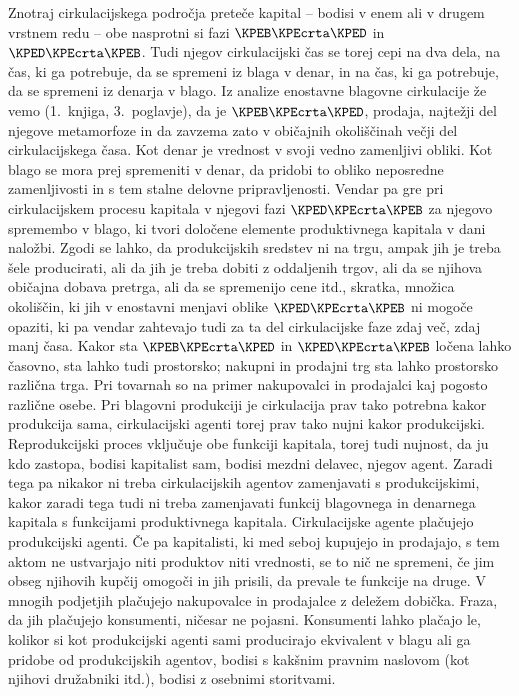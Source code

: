 \documentclass[kapital_02.tex]{subfiles}
\begin{document}
Znotraj cirkulacijskega področja preteče kapital -- bodisi v enem ali v drugem vrstnem redu -- obe nasprotni si fazi \( \KPEB \KPEcrta \KPED \) in \( \KPED \KPEcrta \KPEB \). Tudi njegov cirkulacijski čas se torej cepi na dva dela, na čas, ki ga potrebuje, da se spremeni iz blaga v denar, in na čas, ki ga potrebuje, da se spremeni iz denarja v blago. Iz analize enostavne blagovne cirkulacije že vemo (1.\ knjiga, 3.\ poglavje), da je \(\KPEB\KPEcrta\KPED\), prodaja, najtežji del njegove metamorfoze in da zavzema zato v običajnih okoliščinah večji del cirkulacijskega časa. Kot denar je vrednost v svoji vedno zamenljivi obliki. Kot blago se mora prej spremeniti v denar, da pridobi to obliko neposredne zamenljivosti in s tem stalne delovne pripravljenosti. Vendar pa gre pri cirkulacijskem procesu kapitala v njegovi fazi \( \KPED \KPEcrta \KPEB \) za njegovo spremembo v blago, ki tvori določene elemente produktivnega kapitala v dani naložbi. Zgodi se lahko, da produkcijskih sredstev ni na trgu, ampak jih je treba šele producirati, ali da jih je treba dobiti z oddaljenih trgov, ali da se njihova običajna dobava pretrga, ali da se spremenijo cene itd., skratka, množica okoliščin, ki jih v enostavni menjavi oblike \( \KPED \KPEcrta \KPEB \) ni mogoče opaziti, ki pa vendar zahtevajo tudi za ta del cirkulacijske faze zdaj več, zdaj manj časa. Kakor sta \( \KPEB \KPEcrta \KPED \) \KPEstran in \( \KPED \KPEcrta \KPEB \) ločena lahko časovno, sta lahko tudi prostorsko; nakupni in prodajni trg sta lahko prostorsko različna trga. Pri tovarnah so na primer nakupovalci in prodajalci kaj pogosto različne osebe. Pri blagovni produkciji je cirkulacija prav tako potrebna kakor produkcija sama, cirkulacijski agenti torej prav tako nujni kakor produkcijski. Reprodukcijski proces vključuje obe funkciji kapitala, torej tudi nujnost, da ju kdo zastopa, bodisi kapitalist sam, bodisi mezdni delavec, njegov agent. Zaradi tega pa nikakor ni treba cirkulacijskih agentov zamenjavati s produkcijskimi, kakor zaradi tega tudi ni treba zamenjavati funkcij blagovnega in denarnega kapitala s funkcijami produktivnega kapitala. Cirkulacijske agente plačujejo produkcijski agenti. Če pa kapitalisti, ki med seboj kupujejo in prodajajo, s tem aktom ne ustvarjajo niti produktov niti vrednosti, se to nič ne spremeni, če jim obseg njihovih kupčij omogoči in jih prisili, da prevale te funkcije na druge. V mnogih podjetjih plačujejo nakupovalce in prodajalce z deležem dobička. Fraza, da jih plačujejo konsumenti, ničesar ne pojasni. Konsumenti lahko plačajo le, kolikor si kot produkcijski agenti sami producirajo ekvivalent v blagu ali ga pridobe od produkcijskih agentov, bodisi s kakšnim pravnim naslovom (kot njihovi družabniki itd.), bodisi z osebnimi storitvami.
\end{document}
